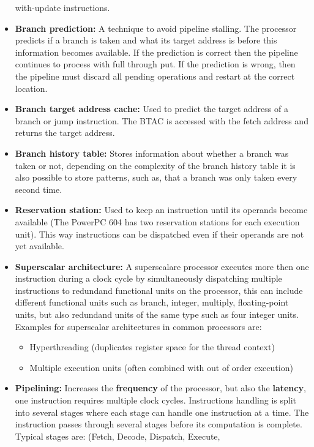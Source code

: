 \documentclass[a4paper,10pt]{article}
\begin{document}
\begin{itemize}
       with-update instructions.
 \item \textbf{Branch prediction:} A technique to avoid pipeline stalling. The processor predicts if a branch is taken and what its 
       target address is before this information becomes available. If the prediction is correct then the pipeline continues to process 
       with full through put. If the prediction is wrong, then the pipeline must discard all pending operations and restart at the 
       correct location.
 \item \textbf{Branch target address cache:} Used to predict the target address of a branch or jump instruction. The BTAC is accessed 
       with the fetch address and returns the target address.
 \item \textbf{Branch history table:} Stores information about whether a branch was taken or not, depending on the complexity of the 
       branch history table it is also possible to store patterns, such as, that a branch was only taken every second time.
 \item \textbf{Reservation station:}  Used to keep an instruction until its operands become available (The PowerPC 604 has two 
       reservation stations for each execution unit). This way instructions can be dispatched even if their operands are not yet 
       available.
 \item \textbf{Superscalar architecture:} A superscalare processor executes more then one instruction during a clock cycle by 
       simultaneously dispatching multiple instructions to redundand functional units on the processor, this can include different 
       functional units such as branch, integer, multiply, floating-point units, but also redundand units
       of the same type such as four integer units. Examples for superscalar architectures in common processors are:
	\begin{itemize}
	    \item Hyperthreading (duplicates register space for the thread context)
	    \item Multiple execution units (often combined with out of order execution)
	\end{itemize}
  \item \textbf{Pipelining:} Increases the \textbf{frequency} of the processor, but also the \textbf{latency}, one instruction requires
multiple clock cycles. Instructions handling is split into several stages where each stage can handle one instruction at a time. The 
instruction passes through several stages before its computation is complete. Typical stages are: (Fetch, Decode, Dispatch, Execute, 

\end{itemize}
\end{document}
